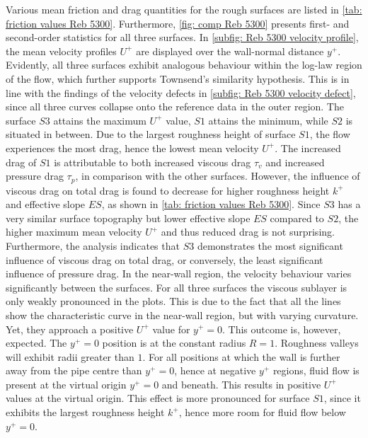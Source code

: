 Various mean friction and drag quantities for the rough surfaces are listed in \autoref{tab: friction values Reb 5300}.
Furthermore, \autoref{fig: comp Reb 5300} presents first- and second-order statistics for all three surfaces. 
In \autoref{subfig: Reb 5300 velocity profile}, the mean velocity profiles $U^+$ are displayed over the wall-normal distance $y^+$. 
Evidently, all three surfaces exhibit analogous behaviour within the log-law region of the flow, which further supports Townsend's similarity hypothesis.
This is in line with the findings of the velocity defects in \autoref{subfig: Reb 5300 velocity defect}, since all three curves collapse onto the reference data in the outer region.
The surface $S3$ attains the maximum $U^+$ value, $S1$ attains the minimum, while $S2$ is situated in between.
Due to the largest roughness height of surface $S1$, the flow experiences the most drag, hence the lowest mean velocity $U^+$.
The increased drag of $S1$ is attributable to both increased viscous drag $\tau_v$ and increased pressure drag $\tau_p$, in comparison with the other surfaces.
However, the influence of viscous drag on total drag is found to decrease for higher roughness height $k^+$ and effective slope $ES$, as shown in \autoref{tab: friction values Reb 5300}. 
Since $S3$ has a very similar surface topography but lower effective slope $ES$ compared to $S2$, the higher maximum mean velocity $U^+$ and thus reduced drag is not surprising.
Furthermore, the analysis indicates that $S3$ demonstrates the most significant influence of viscous drag on total drag, or conversely, the least significant influence of pressure drag.
In the near-wall region, the velocity behaviour varies significantly between the surfaces.
For all three surfaces the viscous sublayer is only weakly pronounced in the plots.
This is due to the fact that all the lines show the characteristic curve in the near-wall region, but with varying curvature.
Yet, they approach a positive $U^+$ value for $y^+ = 0$.
This outcome is, however, expected.
The $y^+ = 0$ position is at the constant radius $R = 1$.
Roughness valleys will exhibit radii greater than $1$.
For all positions at which the wall is further away from the pipe centre than $y^+ = 0$, hence at negative $y^+$ regions, fluid flow is present at the virtual origin $y^+ = 0$ and beneath.
This results in positive $U^+$ values at the virtual origin. 
This effect is more pronounced for surface $S1$, since it exhibits the largest roughness height $k^+$, hence more room for fluid flow below $y^+ = 0$.

